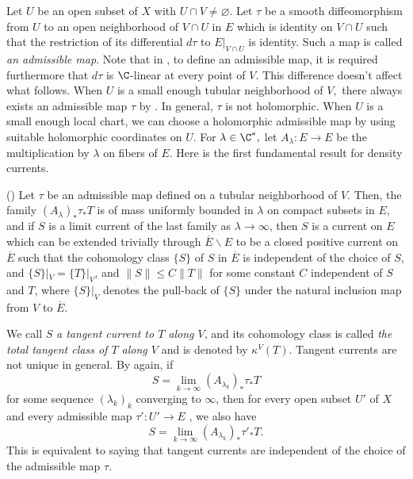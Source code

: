    Let $U$ be an open subset of $X$ with $U \cap V \not = \varnothing.$  Let $\tau$ be  a smooth diffeomorphism  from $U$ to an open neighborhood of $V\cap U$ in $E$ which is identity on $V\cap U$ such that  the restriction of its differential $d\tau$ to $E|_{V \cap U}$ is identity.  Such a map is called \emph{an admissible map}.  Note that in \cite{Dinh_Sibony_density}, to define an admissible map,  it is required furthermore that $d\tau$ is $\C$-linear at every point of $V$. This difference doesn't affect what follows.  When $U$ is a small enough tubular neighborhood of $V,$ there always exists an admissible map $\tau$ by \cite[Lemma 4.2]{Dinh_Sibony_density}. In general, $\tau$ is not holomorphic.  When $U$ is a small enough local chart, we can choose a holomorphic admissible map by using suitable holomorphic coordinates on $U$.   For $\lambda \in \C^*,$ let $A_\lambda: E \to E$ be the multiplication by $\lambda$ on fibers of $E.$  Here is the first fundamental result for density currents.

    \begin{theorem} \label{th-dieukienHVconictangenetcurrent} (\cite[Theorem 4.6]{Dinh_Sibony_density})
        Let $\tau$ be an admissible map defined on a tubular neighborhood of $V$. Then,  the family $(A_\lambda)_* \tau_* T$ is of mass uniformly bounded in $\lambda$ on compact subsets in $E$, and  if $S$ is a limit current of the last family as $\lambda \to \infty$, then  $S$ is a current on $E$ which can be extended trivially through $\overline E \backslash E$ to be a closed positive current on $\overline E$  such that the cohomology class $\{S\}$ of $S$ in $\overline E$ is independent of the choice of $S$, and $\{S\}|_V= \{T\}|_V$,  and $\|S\| \le C \|T\|$ for some constant $C$ independent of $S$ and $T$, where $\{S\}|_V$ denotes the pull-back of $\{S\}$ under the natural inclusion map from $V$ to $\overline{E}$.  
    \end{theorem}

    We call $S$  \emph{a tangent current to $T$ along $V$}, and its cohomology class is called \emph{the total tangent class of $T$ along $V$} and is denoted by $\kappa^V(T)$. Tangent currents are not unique in general. By \cite[Theorem 4.6]{Dinh_Sibony_density} again,  if 
    $$S=\lim_{k\to \infty} (A_{\lambda_k})_* \tau_* T$$ for some sequence $(\lambda_k)_k$ converging to $\infty$, then  for every open subset $U'$ of $X$ and  every admissible map $\tau': U' \to E$ , we also have  
    $$S=\lim_{k\to \infty} (A_{\lambda_k})_* \tau'_* T.$$
    This is equivalent to saying that tangent currents are independent of the choice of the admissible map $\tau$.  


